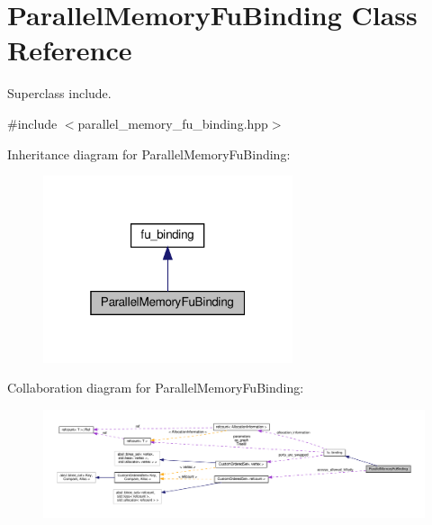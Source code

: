 \hypertarget{classParallelMemoryFuBinding}{}\section{Parallel\+Memory\+Fu\+Binding Class Reference}
\label{classParallelMemoryFuBinding}


Superclass include.  




{\ttfamily \#include $<$parallel\+\_\+memory\+\_\+fu\+\_\+binding.\+hpp$>$}



Inheritance diagram for Parallel\+Memory\+Fu\+Binding\+:
\nopagebreak
\begin{figure}[H]
\begin{center}
\leavevmode
\includegraphics[width=208pt]{d3/d6e/classParallelMemoryFuBinding__inherit__graph}
\end{center}
\end{figure}


Collaboration diagram for Parallel\+Memory\+Fu\+Binding\+:
\nopagebreak
\begin{figure}[H]
\begin{center}
\leavevmode
\includegraphics[width=350pt]{dd/dc4/classParallelMemoryFuBinding__coll__graph}
\end{center}
\end{figure}
